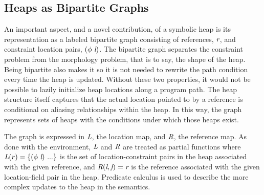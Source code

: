 \subsection{Heaps as Bipartite Graphs}
An important aspect, and a novel contribution, of a symbolic heap is
its representation as a labeled bipartite graph consisting of
references, $\emph{r}$, and constraint location pairs,
$\lp\phi\ \cfgnt{l}\rp$. The bipartite graph separates the constraint
problem from the morphology problem, that is to say, the shape of the
heap. Being bipartite also makes it so it is not needed to rewrite the
path condition every time the heap is updated. Without these two
properties, it would not be possible to lazily initialize heap
locations along a program path. The heap structure itself captures
that the actual location pointed to by a reference is conditional on
aliasing relationships within the heap. In this way, the graph
represents sets of heaps with the conditions under which those heaps
exist.

The graph is expressed in $\emph{L}$, the location map, and
$\emph{R}$, the reference map. As done with the environment,
$\emph{L}$ and $\emph{R}$ are treated as partial functions where
$\cfgnt{L}(r) = \{(\phi\ \cfgnt{l})\ ...\}$ is the set of
location-constraint pairs in the heap associated with the given
reference, and $\emph{R}(\emph{l},\emph{f}) = \emph{r}$ is the
reference associated with the given location-field pair in the
heap. Predicate calculus is used to describe the more complex updates
to the heap in the semantics.


